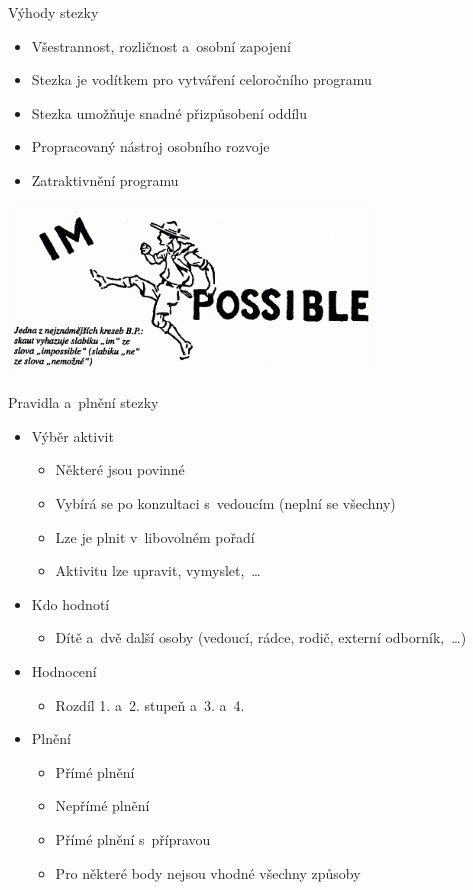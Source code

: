 \documentclass[compress,xelatex,xcolor=dvipsnames,print]{beamer}
\begin{document}
\begin{frame}{Výhody stezky}
\begin{itemize}
\item Všestrannost, rozličnost a~osobní zapojení
\item Stezka je vodítkem pro vytváření celoročního programu
\item Stezka umožňuje snadné přizpůsobení oddílu
\item Propracovaný nástroj osobního rozvoje
\item Zatraktivnění programu
\end{itemize}
\begin{center}
\includegraphics[height=4.5cm]{im-possible_m.png}
\end{center}
\end{frame}

\begin{frame}{Pravidla a~plnění stezky}
\begin{itemize}
\item Výběr aktivit
 \begin{itemize}
 \item Některé jsou povinné
 \item Vybírá se po konzultaci s~vedoucím (neplní se všechny)
 \item Lze je plnit v~libovolném pořadí
 \item Aktivitu lze upravit, vymyslet,~\ldots
 \end{itemize}
\item Kdo hodnotí
 \begin{itemize}
 \item Dítě a~dvě další osoby (vedoucí, rádce, rodič, externí odborník,~\ldots)
 \end{itemize}
\item Hodnocení
 \begin{itemize}
 \item Rozdíl 1. a~2. stupeň a~3. a~4.
 \end{itemize}
\item Plnění
 \begin{itemize}
 \item Přímé plnění
 \item Nepřímé plnění
 \item Přímé plnění s~přípravou
 \item Pro některé body nejsou vhodné všechny způsoby
 \end{itemize}
\end{itemize}
\end{frame}
\end{document}
